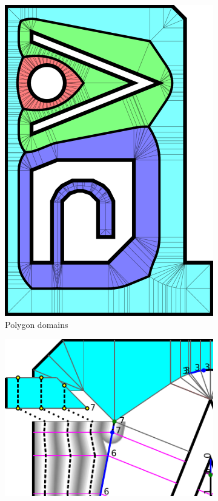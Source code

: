 \begin{figure}
\centering
\setlength{\figheight}{.3\columnwidth}
\begin{subfigure}{.5\columnwidth}\centering
\includegraphics[width=\figheight,rotate=90]{sources/method/domains.pdf}
\caption{Polygon domains}\label{shape_decomposition_domains}
\end{subfigure}
\begin{subfigure}{.45\columnwidth}\centering
\includegraphics[height=\figheight]{sources/method/segment_generation.pdf}

\end{subfigure}
\end{figure}
